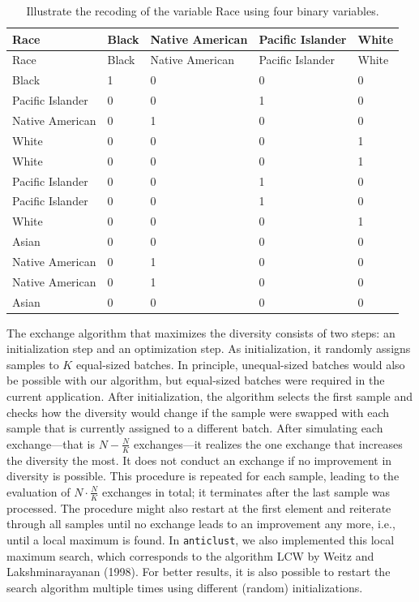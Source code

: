 \documentclass[
]{article}
\begin{document}
\begin{longtable}[]{@{}lllll@{}}
\caption{Illustrate the recoding of the variable Race using four binary
variables.}\tabularnewline
\toprule\noalign{}
Race & Black & Native American & Pacific Islander & White \\
\midrule\noalign{}
\endfirsthead
\toprule\noalign{}
Race & Black & Native American & Pacific Islander & White \\
\midrule\noalign{}
\endhead
\bottomrule\noalign{}
\endlastfoot
Black & 1 & 0 & 0 & 0 \\
Pacific Islander & 0 & 0 & 1 & 0 \\
Native American & 0 & 1 & 0 & 0 \\
White & 0 & 0 & 0 & 1 \\
White & 0 & 0 & 0 & 1 \\
Pacific Islander & 0 & 0 & 1 & 0 \\
Pacific Islander & 0 & 0 & 1 & 0 \\
White & 0 & 0 & 0 & 1 \\
Asian & 0 & 0 & 0 & 0 \\
Native American & 0 & 1 & 0 & 0 \\
Native American & 0 & 1 & 0 & 0 \\
Asian & 0 & 0 & 0 & 0 \\
\end{longtable}

The exchange algorithm that maximizes the diversity consists of two
steps: an initialization step and an optimization step. As
initialization, it randomly assigns samples to \(K\) equal-sized
batches. In principle, unequal-sized batches would also be possible with
our algorithm, but equal-sized batches were required in the current
application. After initialization, the algorithm selects the first
sample and checks how the diversity would change if the sample were
swapped with each sample that is currently assigned to a different
batch. After simulating each exchange---that is \(N - \frac{N}{K}\)
exchanges---it realizes the one exchange that increases the diversity
the most. It does not conduct an exchange if no improvement in diversity
is possible. This procedure is repeated for each sample, leading to the
evaluation of \(N \cdot \frac{N}{K}\) exchanges in total; it terminates
after the last sample was processed. The procedure might also restart at
the first element and reiterate through all samples until no exchange
leads to an improvement any more, i.e., until a local maximum is found.
In \texttt{anticlust}, we also implemented this local maximum search,
which corresponds to the algorithm LCW by Weitz and Lakshminarayanan
(1998). For better results, it is also possible to restart the search
algorithm multiple times using different (random) initializations.
\end{document}
